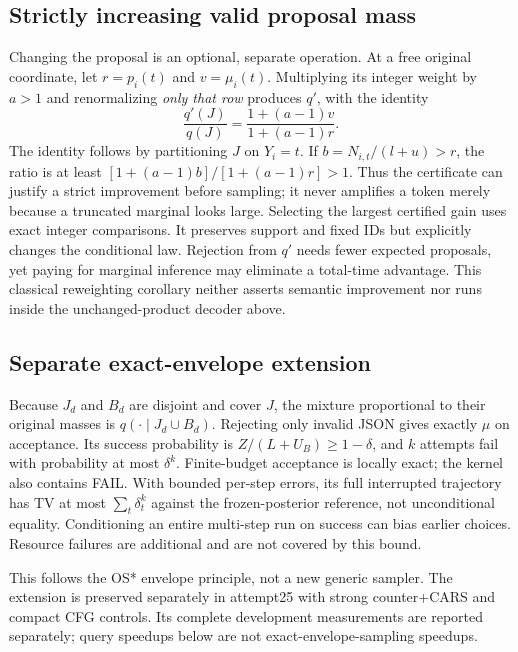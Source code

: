 \documentclass[12pt]{article}
\theoremstyle{readable}
\begin{document}
\subsection{Strictly increasing valid proposal mass}

Changing the proposal is an optional, separate operation. At a free original
coordinate, let $r=p_i(t)$ and $v=\mu_i(t)$. Multiplying its integer weight by
$a>1$ and renormalizing \emph{only that row} produces $q'$, with the identity
\begin{equation}
 \frac{q'(J)}{q(J)}=\frac{1+(a-1)v}{1+(a-1)r}.
 \label{eq:amplification}
\end{equation}
The identity follows by partitioning $J$ on $Y_i=t$. If
$b=N_{i,t}/(l+u)>r$, the ratio is at least
$[1+(a-1)b]/[1+(a-1)r]>1$. Thus the certificate can justify a strict improvement
before sampling; it never amplifies a token merely because a truncated
marginal looks large. Selecting the largest certified gain uses exact integer
comparisons. It preserves support and fixed IDs but explicitly changes the
conditional law. Rejection from $q'$ needs fewer expected proposals, yet paying
for marginal inference may eliminate a total-time advantage. This classical
reweighting corollary neither asserts semantic improvement nor runs inside
the unchanged-product decoder above.

\subsection{Separate exact-envelope extension}

Because $J_d$ and $B_d$ are disjoint and cover $J$, the mixture proportional
to their original masses is $q(\cdot\mid J_d\cup B_d)$. Rejecting only invalid
JSON gives exactly $\mu$ on acceptance. Its success probability is
$Z/(L+U_B)\ge1-\delta$, and $k$ attempts fail with probability at most $\delta^k$.
Finite-budget acceptance is locally exact; the kernel also contains FAIL.
With bounded per-step errors, its full interrupted trajectory has TV at most
$\sum_t\delta_t^k$ against the frozen-posterior reference, not unconditional
equality. Conditioning an entire multi-step run on success can bias earlier
choices. Resource failures are additional and are not covered by this bound.

This follows the OS* envelope principle, not a new generic sampler. The
extension is preserved separately in attempt25 with strong counter+CARS and
compact CFG controls. Its complete development measurements are reported separately;
query speedups below are not exact-envelope-sampling speedups.
\end{document}
